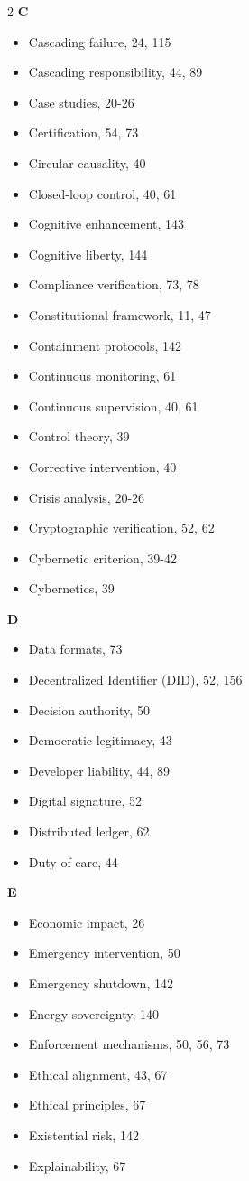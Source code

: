 \begin{multicols}{2}
\textbf{C}
\begin{itemize}[leftmargin=0.5cm]
\item Cascading failure, 24, 115
\item Cascading responsibility, 44, 89
\item Case studies, 20-26
\item Certification, 54, 73
\item Circular causality, 40
\item Closed-loop control, 40, 61
\item Cognitive enhancement, 143
\item Cognitive liberty, 144
\item Compliance verification, 73, 78
\item Constitutional framework, 11, 47
\item Containment protocols, 142
\item Continuous monitoring, 61
\item Continuous supervision, 40, 61
\item Control theory, 39
\item Corrective intervention, 40
\item Crisis analysis, 20-26
\item Cryptographic verification, 52, 62
\item Cybernetic criterion, 39-42
\item Cybernetics, 39
\end{itemize}

\textbf{D}
\begin{itemize}[leftmargin=0.5cm]
\item Data formats, 73
\item Decentralized Identifier (DID), 52, 156
\item Decision authority, 50
\item Democratic legitimacy, 43
\item Developer liability, 44, 89
\item Digital signature, 52
\item Distributed ledger, 62
\item Duty of care, 44
\end{itemize}

\textbf{E}
\begin{itemize}[leftmargin=0.5cm]
\item Economic impact, 26
\item Emergency intervention, 50
\item Emergency shutdown, 142
\item Energy sovereignty, 140
\item Enforcement mechanisms, 50, 56, 73
\item Ethical alignment, 43, 67
\item Ethical principles, 67
\item Existential risk, 142
\item Explainability, 67
\end{itemize}


\end{multicols}
